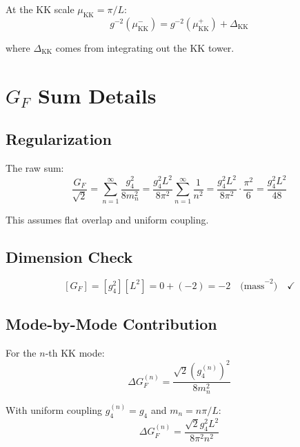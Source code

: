 \documentclass[11pt,a4paper]{article}
\begin{document}
At the KK scale $\mu_{\text{KK}} = \pi/L$:
\begin{equation}
\label{eq:threshold}
g^{-2}(\mu_{\text{KK}}^-) = g^{-2}(\mu_{\text{KK}}^+) + \Delta_{\text{KK}}
\end{equation}

where $\Delta_{\text{KK}}$ comes from integrating out the KK tower.

\section{$G_F$ Sum Details}
\label{app:gf-sum}

\subsection{Regularization}
\label{app:regularization}

The raw sum:
\begin{equation}
\label{eq:gf-raw-sum}
\frac{G_F}{\sqrt{2}} = \sum_{n=1}^{\infty} \frac{g_4^2}{8 m_n^2}
= \frac{g_4^2 L^2}{8\pi^2} \sum_{n=1}^{\infty} \frac{1}{n^2}
= \frac{g_4^2 L^2}{8\pi^2} \cdot \frac{\pi^2}{6}
= \frac{g_4^2 L^2}{48}
\end{equation}

This assumes flat overlap and uniform coupling.

\subsection{Dimension Check}
\label{app:dim-check}

\begin{equation}
\label{eq:gf-dim-check}
[G_F] = [g_4^2][L^2] = 0 + (-2) = -2 \quad \text{(mass}^{-2}\text{)} \quad \checkmark
\end{equation}

\subsection{Mode-by-Mode Contribution}
\label{app:mode-contribution}

For the $n$-th KK mode:
\begin{equation}
\label{eq:gf-mode-n}
\Delta G_F^{(n)} = \frac{\sqrt{2} (g_4^{(n)})^2}{8 m_n^2}
\end{equation}

With uniform coupling $g_4^{(n)} = g_4$ and $m_n = n\pi/L$:
\begin{equation}
\label{eq:gf-mode-uniform}
\Delta G_F^{(n)} = \frac{\sqrt{2} g_4^2 L^2}{8 \pi^2 n^2}
\end{equation}
\end{document}

